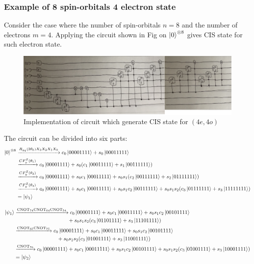 \documentclass[11pt, oneside]{article}   	%
\begin{document}
\subsubsection{Example of 8 spin-orbitals 4 electron state}
Consider the case where the number of spin-orbitals $n = 8$ and the number of electrons $m = 4$.
Applying the circuit shown in Fig on $\ket{0}^{\otimes 8}$ gives CIS state for such electron state.

\begin{figure}
\centering
\includegraphics[width=0.75 \linewidth]{figs/fig_cis_circuit_4e_4o}
\caption{Implementation of circuit which generate CIS state for $(4e, 4o)$}
\end{figure}

The circuit can be divided into six parts:
\begin{align*}
\ket{0}^{\otimes 8} 
&\xrightarrow{R_{y_4}(2 \theta_0) X_3 X_2 X_1 X_0} c_0 \ket{00001111} + s_0 \ket{00011111} \\
&\xrightarrow{CF^Z_y(\theta_1)} c_0 \ket{00001111} + s_0 (c_1 \ket{00011111} + s_1 \ket{00111111}) \\
&\xrightarrow{CF^Z_y(\theta_2)} 
c_0 \ket{00001111} 
+ s_0 c_1 \ket{00011111}
+ s_0 s_1 (c_2 \ket{00111111} + s_2 \ket{01111111} ) \\
&\xrightarrow{CF^Z_y(\theta_3)} 
c_0 \ket{00001111} 
+ s_0 c_1 \ket{00011111}
+ s_0 s_1 c_2 \ket{00111111}
+ s_0 s_1 s_2 (c_3 \ket{01111111} + s_3 \ket{11111111}) \\
& = \ket{\psi_1}
\end{align*}

\begin{align*}
\ket{\psi_1}
&\xrightarrow{\text{CNOT}_{74} \text{CNOT}_{64} \text{CNOT}_{54}} 
c_0 \ket{00001111} 
+ s_0 c_1 \ket{00011111}
+ s_0 s_1 c_2 \ket{00101111} \\
& \hspace{10em} + s_0 s_1 s_2 (c_3 \ket{01101111} + s_3 \ket{11101111}) \\
&\xrightarrow{\text{CNOT}_{65} \text{CNOT}_{75}} 
c_0 \ket{00001111} 
+ s_0 c_1 \ket{00011111}
+ s_0 s_1 c_2 \ket{00101111} \\
& \hspace{8em} + s_0 s_1 s_2 (c_3 \ket{01001111} + s_3 \ket{11001111}) \\
&\xrightarrow{\text{CNOT}_{76}} 
c_0 \ket{00001111} 
+ s_0 c_1 \ket{00011111}
+ s_0 s_1 c_2 \ket{00101111} + s_0 s_1 s_2 (c_3 \ket{01001111} + s_3 \ket{10001111}) \\
& = \ket{\psi_2} 
\end{align*}
\end{document}
